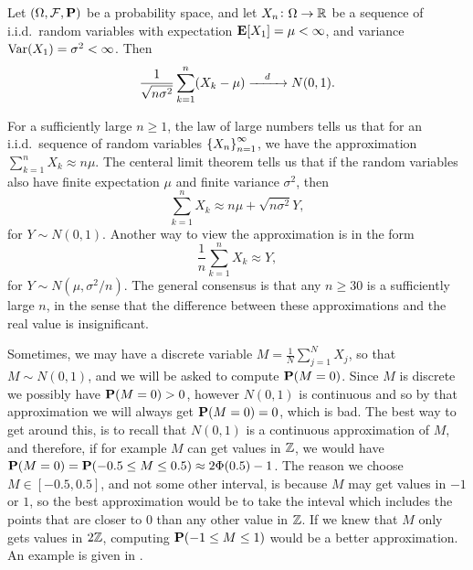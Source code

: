 \documentclass[11pt,a4paper]{article}
\begin{document}
\begin{theorem}
  \label{thm:clt}
  Let $(\Omega,\mathcal F,\mathbf{P})$ be a probability space,
  and let $X_n \colon \Omega \to \mathbb{R}$ be a sequence of i.i.d.\
  random variables with expectation $\mathbf{E}[X_1] = \mu < \infty$,
  and variance $\operatorname{Var}(X_1) = \sigma^2 < \infty$.
  Then
  \[
    \frac{1}{\sqrt{n \sigma^2}} \sum_{k=1}^{n} (X_k - \mu) \xrightarrow{\quad d\quad}
    N(0,1).
  \]
\end{theorem}

\begin{remark}
  For a sufficiently large $n \geq 1$,
  the law of large numbers tells us that for an i.i.d.\
  sequence of random variables $\left\{X_n\right\}_{n=1}^{\infty}$,
  we have the approximation $\sum_{k=1}^{n} X_k \approx n\mu$.
  The centeral limit theorem tells us that if the random variables
  also have finite expectation $\mu$ and finite variance $\sigma^2$,
  then
  \[
    \sum_{k=1}^{n} X_k \approx
    n\mu + \sqrt{n \sigma^2} Y,
  \]
  for $Y \sim N(0,1)$.
  Another way to view the approximation is in the form
  \[
    \frac{1}{n} \sum_{k=1}^{n} X_k \approx Y,
  \]
  for $Y \sim N(\mu,\sigma^2/n)$.
  The general consensus is that any $n \geq 30$ is a sufficiently
  large $n$, in the sense that the
  difference between these approximations and the real value
  is insignificant.
\end{remark}

\begin{remark}
  Sometimes, we may have a discrete variable
  $M = \frac{1}{N} \sum_{j=1}^{N} X_j$,
  so that $M \sim N(0,1)$, and we will be asked to compute $\mathbf{P}(M = 0)$.
  Since $M$ is discrete we possibly have $\mathbf{P}(M = 0) > 0$,
  however $N(0,1)$ is continuous and so by that approximation
  we will always get $\mathbf{P}(M = 0) = 0$,
  which is bad.
  The best way to get around this,
  is to recall that $N(0,1)$ is a continuous approximation of $M$,
  and therefore, if for example $M$ can get values in $\mathbb{Z}$,
  we would have $\mathbf{P}(M = 0) = \mathbf{P}(-0.5 \le M \le 0.5) \approx
  2\Phi(0.5) - 1$.
  The reason we choose $M \in [-0.5, 0.5]$,
  and not some other interval, is because $M$ may get values in $-1$ or $1$,
  so the best approximation would be to take the inteval which includes
  the points that are closer to $0$ than any other value in $\mathbb{Z}$.
  If we knew that $M$ only gets values in $2\mathbb{Z}$,
  computing $\mathbf{P}(-1 \le M \le 1)$ would be a better approximation.
  An example is given in \Cref{ex:discrete}.
\end{remark}
\end{document}
